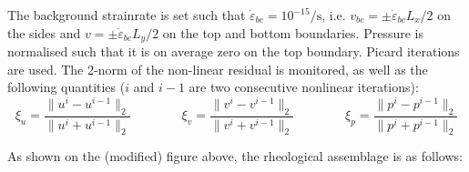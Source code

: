 The background strainrate is set such that $\dot{\varepsilon}_{bc}=10^{-15}\si{\per\second}$, i.e. 
$v_{bc}=\pm \dot{\varepsilon}_{bc} L_x/2 $ on the sides and $v=\pm \dot{\varepsilon}_{bc} L_y/2 $
on the top and bottom boundaries. Pressure is normalised such that it is on average zero on the top boundary. 
Picard iterations are used. The 2-norm of the non-linear residual 
is monitored, as well as the following quantities ($i$ and $i-1$ are two consecutive nonlinear iterations):
\[
\xi_u = \frac{\|u^i-u^{i-1}\|_2}{ \|u^i+u^{i-1}\|_2}
\qquad
\qquad
\xi_v = \frac{\|v^i-v^{i-1}\|_2}{ \|v^i+v^{i-1}\|_2}
\qquad
\qquad
\xi_p = \frac{\|p^i-p^{i-1}\|_2}{ \|p^i+p^{i-1}\|_2}
\] 

As shown on the (modified) figure above, the rheological assemblage is as follows:
\begin{center}

\end{center}


